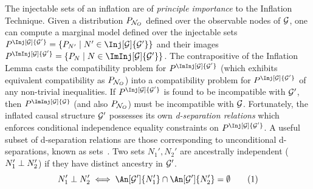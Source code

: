 \documentclass[aps, 10pt, english, twoside, pra, nofootinbib, tightenlines, longbibliography, superscriptaddress]{revtex4-1}
\begin{document}
    The injectable sets of an inflation are of \textit{principle importance} to the Inflation Technique. Given a distribution $\prob[\nodes_{O}]$ defined over the observable nodes of $\mathcal{G}$, one can compute a marginal model defined over the injectable sets $\prob^{\Inj[\graph]{\graph'}} = \bc{\prob[N'] \mid N' \in \Inj[\graph]{\graph'}}$ and their images $\prob^{\ImInj[\graph]{\graph'}} = \bc{\prob[N] \mid N \in \ImInj[\graph]{\graph'}}$. The contrapositive of the Inflation Lemma casts the compatibility problem for $\prob^{\ImInj[\graph]{\graph'}}$ (which exhibits equivalent compatibility as $\prob[\nodes_O]$) into a compatibility problem for $\prob^{\Inj[\graph]{\graph'}}$ of any non-trivial inequalities. If $\prob^{\Inj[\graph]{\graph'}}$ is found to be incompatible with $\mathcal{G}'$, then $\prob^{\ImInj[\graph]{\graph}}$ (and also $\prob[\nodes_O]$) must be incompatible with $\mathcal{G}$. Fortunately, the inflated causal structure $\mathcal{G}'$ possesses its own \textit{d-separation relations} which enforces conditional independence equality constraints on $\prob^{\Inj[\graph]{\graph'}}$. A useful subset of d-separation relations are those corresponding to unconditional d-separations, known as  sets~\cite{Pearl_2009}. Two sets $N_1', N_2'$ are ancestrally independent ($N_1' \perp N_2'$) if they have distinct ancestry in $\mathcal{G}'$.
    \[ N_1' \ancestralindep N_2' \iff \An[\graph']{N_1'} \cap \An[\graph']{N_2'}= \emptyset \eq \]
\end{document}
